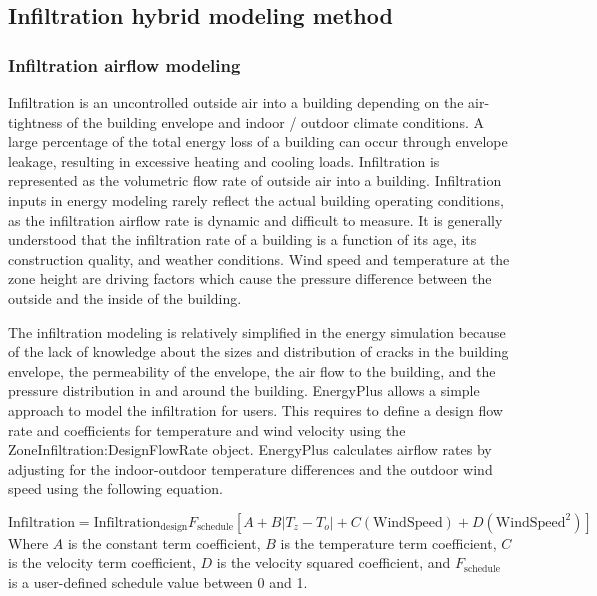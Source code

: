 \subsection{Infiltration hybrid modeling method}\label{Infiltration hybrid modeling method}

\subsubsection{Infiltration airflow modeling}\label{Infiltration airflow modeling}

Infiltration is an uncontrolled outside air into a building depending on the air-tightness of the building envelope and indoor / outdoor climate conditions. A large percentage of the total energy loss of a building can occur through envelope leakage, resulting in excessive heating and cooling loads. Infiltration is represented as the volumetric flow rate of outside air into a building. Infiltration inputs in energy modeling rarely reflect the actual building operating conditions, as the infiltration airflow rate is dynamic and difficult to measure. It is generally understood that the infiltration rate of a building is a function of its age, its construction quality, and weather conditions. Wind speed and temperature at the zone height are driving factors which cause the pressure difference between the outside and the inside of the building.

The infiltration modeling is relatively simplified in the energy simulation because of the lack of knowledge about the sizes and distribution of cracks in the building envelope, the permeability of the envelope, the air flow to the building, and the pressure distribution in and around the building. EnergyPlus allows a simple approach to model the infiltration for users. This requires to define a design flow rate and coefficients for temperature and wind velocity using the ZoneInfiltration:DesignFlowRate object. EnergyPlus calculates airflow rates by adjusting for the indoor-outdoor temperature differences and the outdoor wind speed using the following equation.

\begin{equation}
\text{Infiltration} = \text{Infiltration}_\text{design} F_\text{schedule} \left[A+B|T_z -T_o|+C (\text{WindSpeed})+D(\text{WindSpeed}^2 )\right]
\end{equation}
Where $A$ is the constant term coefficient, $B$ is the temperature term coefficient, $C$ is the velocity term coefficient, $D$ is the velocity squared coefficient, and $F_\text{schedule}$ is a user-defined schedule value between 0 and 1.

